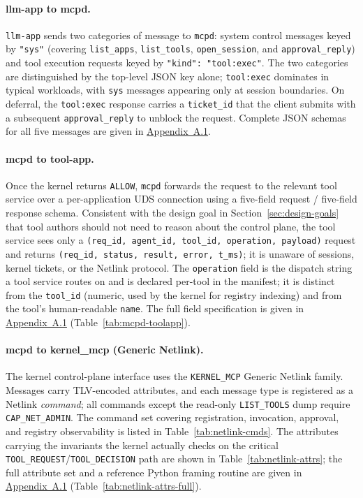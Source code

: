 \paragraph{llm-app to mcpd.}
\texttt{llm-app} sends two categories of message to \texttt{mcpd}: system control messages keyed by \texttt{"sys"} (covering \texttt{list\_\allowbreak apps}, \texttt{list\_\allowbreak tools}, \texttt{open\_\allowbreak session}, and \texttt{approval\_\allowbreak reply}) and tool execution requests keyed by \texttt{"kind": "tool:exec"}.
The two categories are distinguished by the top-level JSON key alone; \texttt{tool:exec} dominates in typical workloads, with \texttt{sys} messages appearing only at session boundaries.
On deferral, the \texttt{tool:exec} response carries a \texttt{ticket\_\allowbreak id} that the client submits with a subsequent \texttt{approval\_\allowbreak reply} to unblock the request.
Complete JSON schemas for all five messages are given in \hyperref[sec:appendix-protocols]{Appendix~A.1}.

\paragraph{mcpd to tool-app.}
Once the kernel returns \texttt{ALLOW}, \texttt{mcpd} forwards the request to the relevant tool service over a per-application UDS connection using a five-field request / five-field response schema.
Consistent with the design goal in Section~\ref{sec:design-goals} that tool authors should not need to reason about the control plane, the tool service sees only a \texttt{(req\_id, agent\_id, tool\_id, operation, payload)} request and returns \texttt{(req\_id, status, result, error, t\_ms)}; it is unaware of sessions, kernel tickets, or the Netlink protocol.
The \texttt{operation} field is the dispatch string a tool service routes on and is declared per-tool in the manifest; it is distinct from the \texttt{tool\_id} (numeric, used by the kernel for registry indexing) and from the tool's human-readable \texttt{name}.
The full field specification is given in \hyperref[sec:appendix-protocols]{Appendix~A.1} (Table~\ref{tab:mcpd-toolapp}).

\paragraph{mcpd to kernel\_mcp (Generic Netlink).}
The kernel control-plane interface uses the \texttt{KERNEL\_\allowbreak MCP} Generic Netlink family.
Messages carry TLV-encoded attributes, and each message type is registered as a Netlink \emph{command}; all commands except the read-only \texttt{LIST\_\allowbreak TOOLS} dump require \texttt{CAP\_\allowbreak NET\_\allowbreak ADMIN}.
The command set covering registration, invocation, approval, and registry observability is listed in Table~\ref{tab:netlink-cmds}.
The attributes carrying the invariants the kernel actually checks on the critical \texttt{TOOL\_\allowbreak REQUEST}/\texttt{TOOL\_\allowbreak DECISION} path are shown in Table~\ref{tab:netlink-attrs}; the full attribute set and a reference Python framing routine are given in \hyperref[sec:appendix-protocols]{Appendix~A.1} (Table~\ref{tab:netlink-attrs-full}).


